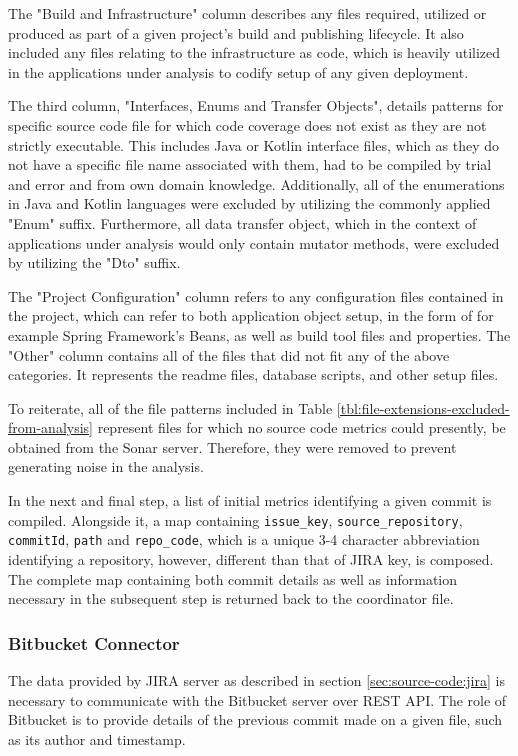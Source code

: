 The "Build and Infrastructure" column describes any files required, utilized or produced as part of a given project's build and publishing lifecycle. It also included any files relating to the infrastructure as code, which is heavily utilized in the applications under analysis to codify setup of any given deployment.

The third column, "Interfaces, Enums and Transfer Objects", details patterns for specific source code file for which code coverage does not exist as they are not strictly executable. This includes Java or Kotlin interface files, which as they do not have a specific file name associated with them, had to be compiled by trial and error and from own domain knowledge. Additionally, all of the enumerations in Java and Kotlin languages were excluded by utilizing the commonly applied "Enum" suffix. Furthermore, all data transfer object, which in the context of applications under analysis would only contain mutator methods, were excluded by utilizing the "Dto" suffix. 

The "Project Configuration" column refers to any configuration files contained in the project, which can refer to both application object setup, in the form of for example Spring Framework's Beans, as well as build tool files and properties. 
The "Other" column contains all of the files that did not fit any of the above categories. It represents the readme files, database scripts, and other setup files.

To reiterate, all of the file patterns included in Table \ref{tbl:file-extensions-excluded-from-analysis} represent files for which no source code metrics could presently, be obtained from the Sonar server. Therefore, they were removed to prevent generating noise in the analysis.
    
In the next and final step, a list of initial metrics identifying a given commit is compiled. Alongside it, a map containing \texttt{issue\_key}, \texttt{source\_repository}, \texttt{commitId}, \texttt{path} and \texttt{repo\_code}, which is a unique 3-4 character abbreviation identifying a repository, however, different than that of JIRA key, is composed. The complete map containing both commit details as well as information necessary in the subsequent step is returned back to the coordinator file. 

\subsubsection{Bitbucket Connector}\label{sec:source-code:bitbucket}
The data provided by JIRA server as described in section \ref{sec:source-code:jira} is necessary to communicate with the Bitbucket server over REST API. The role of Bitbucket is to provide details of the previous commit made on a given file, such as its author and timestamp. 

